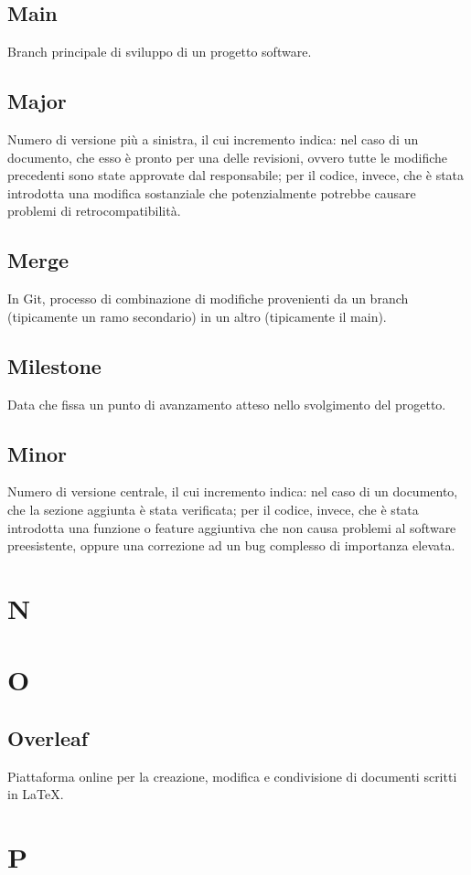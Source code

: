     \subsection{Main}
    Branch principale di sviluppo di un progetto software.
    \subsection{Major}
    Numero di versione più a sinistra, il cui incremento indica: nel caso di un documento, che esso è pronto per una delle revisioni, ovvero tutte le modifiche precedenti sono state 
    approvate dal responsabile; per il codice, invece, che è stata introdotta una modifica sostanziale che potenzialmente potrebbe causare problemi di retrocompatibilità.
    \subsection{Merge}
    In Git, processo di combinazione di modifiche provenienti da un branch (tipicamente 
    un ramo secondario) in un altro (tipicamente il main).
    \subsection{Milestone}
    Data che fissa un punto di avanzamento atteso nello svolgimento del progetto.
    \subsection{Minor}
    Numero di versione centrale, il cui incremento indica: nel caso di un documento, che la sezione aggiunta è stata verificata; per il codice, invece, che è stata
    introdotta una funzione o feature aggiuntiva che non causa problemi al software preesistente, oppure una correzione ad un bug complesso di importanza elevata.
\pagebreak
\section{N}
\pagebreak
\section{O}
    \subsection{Overleaf}
    Piattaforma online per la creazione, modifica e condivisione di documenti 
    scritti in LaTeX.
\pagebreak
\section{P}
